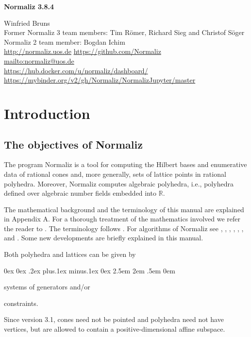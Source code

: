 \documentclass[12pt,a4paper]{scrartcl}
\newcounter{listi}
\newcommand{\stdli}{ \topsep0ex \partopsep0ex %
\parsep.2ex plus.1ex minus.1ex \itemsep0ex%
\leftmargin2.5em \labelwidth2em \labelsep.5em \rightmargin0em}%
\newenvironment{arab}{\begin{list}{\textup{(\arabic{listi})}}%
	{\usecounter{listi}\stdli}}{\end{list}}
\theoremstyle{definition}
\def\RR{{\mathbb R}}
\def\version{3.8.4}
\begin{document}
\vspace*{2cm}

\centerline{\Large\textbf{Normaliz \version}}

\vspace*{1.5cm}

\begin{center}Winfried Bruns\\[14pt]
	Former Normaliz 3 team members:  Tim R\"omer, Richard Sieg and Christof S\"oger\\[14pt]
	Normaliz 2 team member: Bogdan Ichim\\[14pt]
	\url{http://normaliz.uos.de}\qquad\qquad\qquad
	\url{https://github.com/Normaliz}\\[14pt]
	\url{mailto:normaliz@uos.de}\\[14pt]
	\url{https://hub.docker.com/u/normaliz/dashboard/}\\[14pt] 
	\url{https://mybinder.org/v2/gh/Normaliz/NormalizJupyter/master}
\end{center}



\tableofcontents

\newpage

\section{Introduction}\label{facil}

\subsection{The objectives of Normaliz}

The program Normaliz  is a tool for computing
the Hilbert bases and enumerative data of rational cones and, more generally, sets of lattice points in rational polyhedra. Moreover, Normaliz computes algebraic polyhedra, i.e., polyhedra defined over algebraic number fields embedded into $\RR$.

The mathematical background and the terminology of this manual are explained in Appendix A. For a thorough treatment of the  mathematics involved we refer the reader to
\cite{BG}. The terminology follows \cite{BG}. For
algorithms of Normaliz see  \cite{BHIKS},  \cite{BI}, \cite{BI2},
\cite{BIS},  \cite{BK02}, \cite{BSS}, and \cite{BS}. Some new developments are briefly explained in this manual.

Both polyhedra and lattices  can be given by
\begin{arab}
	\item systems of generators and/or
	\item constraints.
\end{arab}
Since version 3.1, cones need not be pointed and polyhedra need not have vertices, but are allowed to contain a positive-dimensional affine subspace.
\end{document}
